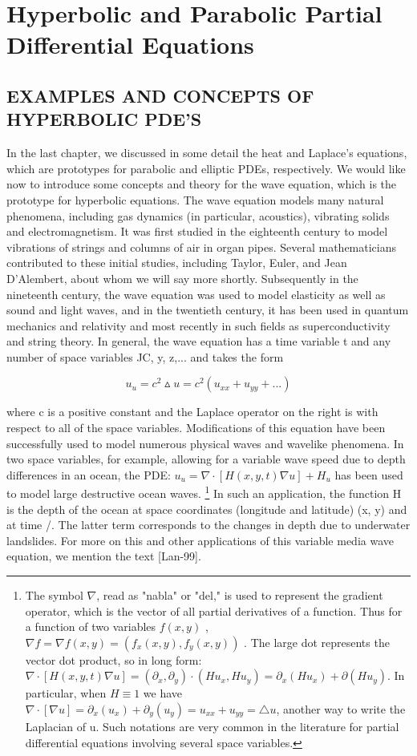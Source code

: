 \documentclass[../main.tex]{subfiles}
\begin{document}
\chapter{Hyperbolic and Parabolic Partial
Differential Equations}

\section{EXAMPLES AND CONCEPTS OF HYPERBOLIC PDE'S}

In the last chapter, we discussed in some detail the heat and Laplace's equations,
which are prototypes for parabolic and elliptic PDEs, respectively. We would like
now to introduce some concepts and theory for the wave equation, which is the
prototype for hyperbolic equations. The wave equation models many natural
phenomena, including gas dynamics (in particular, acoustics), vibrating solids and
electromagnetism. It was first studied in the eighteenth century to model vibrations
of strings and columns of air in organ pipes. Several mathematicians contributed
to these initial studies, including Taylor, Euler, and Jean D'Alembert, about whom
we will say more shortly. Subsequently in the nineteenth century, the wave
equation was used to model elasticity as well as sound and light waves, and in the
twentieth century, it has been used in quantum mechanics and relativity and most
recently in such fields as superconductivity and string theory. In general, the
wave equation has a time variable t and any number of space variables JC, y, z,...
and takes the form

\begin{equation} \label{eqa1}
u_u=c^2 \vartriangle u=c^2(u_{xx}+u_{yy}+...) 
\end{equation}

where c is a positive constant and the Laplace operator on the right is with respect
to all of the space variables. Modifications of this equation have been successfully
used to model numerous physical waves and wavelike phenomena. In two space
variables, for example, allowing for a variable wave speed due to depth
differences in an ocean, the PDE:
$u_u=\nabla \cdot[H(x,y,t) \nabla u] + H_u$
has been used to
model large destructive ocean waves. 
\footnote 
{ The symbol $\nabla$, read as "nabla" or "del," is used to represent the gradient operator, which is the
vector of all partial derivatives of a function. Thus for a function of two variables 
$f(x,y)$ , $\nabla f=\nabla  f(x,y)=(f_x(x,y), f_y(x,y))$
. The large dot represents the vector dot product, so in long form: 
$\nabla \cdot [H(x,y,t)\nabla u]= (\partial_x, \partial_y)\cdot (Hu_x, Hu_y)=\partial_x (Hu_x)+\partial(Hu_y)$. In particular, when  $H\equiv 1$ we have $\nabla \cdot [\nabla u]=\partial_x (u_x)+ \partial_y(u_y)=u_{xx}+u_{yy}=\triangle u $, another way to write the Laplacian of u. Such notations
are very common in the literature for partial differential equations involving several space variables.}
In such an application, the function H is the
depth of the ocean at space coordinates (longitude and latitude) (x, y) and at time /.
The latter term corresponds to the changes in depth due to underwater landslides.
For more on this and other applications of this variable media wave equation, we
mention the text [Lan-99].
\end{document}
